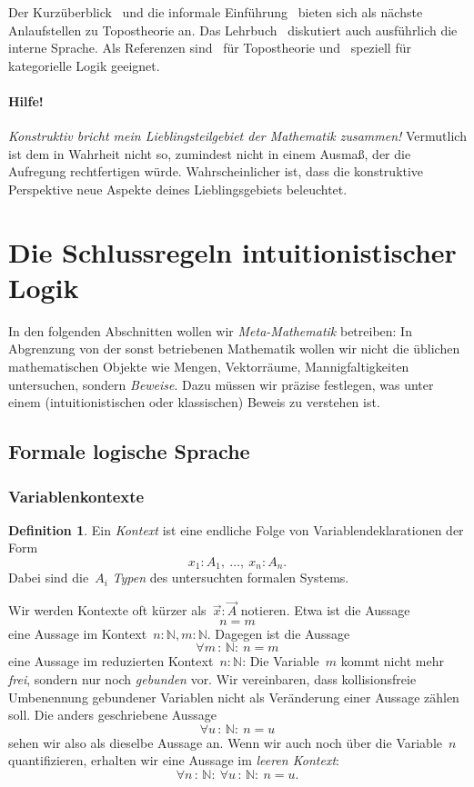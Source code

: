 \documentclass[a4paper,ngerman,12pt]{scrartcl}
\theoremstyle{definition}
\newtheorem{defn}{Definition}[section]
\theoremstyle{plain}
\theoremstyle{remark}
\newcommand{\NN}{\mathbb{N}}
\renewcommand{\_}{\mathpunct{.}\,}
\newcommand{\?}{\,{:}\,}
\begin{document}
Der Kurzüberblick~\cite{baez:topos} und die informale
Einführung~\cite{leinster:topos} bieten sich als nächste Anlaufstellen zu
Topostheorie an.
Das Lehrbuch~\cite{moerdijk:maclane:sheaves} diskutiert auch ausführlich die
interne Sprache. Als Referenzen sind~\cite{johnstone:elephant} für Topostheorie
und~\cite{lambek:scott:hocatlogic} speziell für kategorielle Logik geeignet.


\paragraph{Hilfe!} \emph{Konstruktiv bricht mein Lieblingsteilgebiet der
Mathematik zusammen!} Vermutlich ist dem in Wahrheit nicht so, zumindest nicht
in einem Ausmaß, der die Aufregung rechtfertigen würde.  Wahrscheinlicher ist,
dass die konstruktive Perspektive neue Aspekte deines Lieblingsgebiets
beleuchtet.


\section{Die Schlussregeln intuitionistischer Logik}

\label{section:schlussregeln}%
In den folgenden Abschnitten wollen wir \emph{Meta-Mathematik} betreiben: In
Abgrenzung von der sonst betriebenen Mathematik wollen wir nicht die üblichen
mathematischen Objekte wie Mengen, Vektorräume, Mannigfaltigkeiten untersuchen,
sondern \emph{Beweise}. Dazu müssen wir präzise festlegen, was unter einem
(intuitionistischen oder klassischen) Beweis zu verstehen ist.


\subsection{Formale logische Sprache}

\subsubsection*{Variablenkontexte}

\begin{defn}Ein \emph{Kontext} ist eine endliche Folge von
Variablendeklarationen der Form
\[ x_1 : A_1,\ \ldots,\ x_n : A_n. \]
Dabei sind die~$A_i$ \emph{Typen} des untersuchten formalen Systems.\end{defn}

Wir werden Kontexte oft kürzer als~$\vec x : \vec A$ notieren. Etwa ist die
Aussage
\[ n = m \]
eine Aussage im Kontext~$n : \NN, m : \NN$. Dagegen ist die Aussage
\[ \forall m\?\NN{:}\ n = m \]
eine Aussage im reduzierten Kontext~$n : \NN$: Die Variable~$m$ kommt
nicht mehr \emph{frei}, sondern nur noch \emph{gebunden} vor. Wir vereinbaren,
dass kollisionsfreie Umbenennung gebundener Variablen nicht als Veränderung
einer Aussage zählen soll. Die anders geschriebene Aussage
\[ \forall u\?\NN{:}\ n = u \]
sehen wir also als dieselbe Aussage an.
Wenn wir auch noch über die
Variable~$n$ quantifizieren, erhalten wir eine Aussage im \emph{leeren Kontext}:
\[ \forall n\?\NN{:}\ \forall u\?\NN{:}\ n = u. \]
\end{document}
